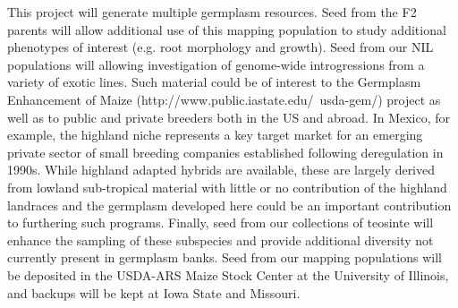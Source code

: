 This project will generate multiple germplasm resources.  Seed from the F2 parents will allow additional use of this mapping population to study additional phenotypes of interest (e.g. root morphology and growth).  Seed from our NIL populations will allowing investigation of genome-wide introgressions from a variety of exotic lines.  Such material could be of interest to the Germplasm Enhancement of Maize (http://www.public.iastate.edu/~usda-gem/) project as well as to public and private breeders both in the US and abroad. In Mexico, for example, the highland niche represents a key target market for an emerging private sector of small breeding companies established following deregulation in 1990s. While highland adapted hybrids are available, these are largely derived from lowland sub-tropical material with little or no contribution of the highland landraces and the germplasm developed here could be an important contribution to furthering such programs. Finally, seed from our collections of teosinte will enhance the sampling of these subspecies and provide additional diversity not currently present in germplasm banks.  Seed from our mapping populations will be deposited in the USDA-ARS Maize Stock Center at the University of Illinois, and backups will be kept at Iowa State and Missouri.




